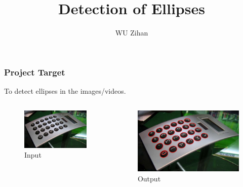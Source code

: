 \documentclass{beamer}
\title{Detection of Ellipses}
\author{WU Zihan}
\begin{document}
    \maketitle
    \begin{frame}
        \frametitle{Project Target}
    
        To detect ellipses in the images/videos.
        \begin{columns}
            \begin{column}{.5\linewidth}
                \begin{figure}
                    \includegraphics[width=0.8\linewidth]{pic/source.jpg}
                    \caption{Input}
                \end{figure}
            \end{column}
            \begin{column}{.5\linewidth}
                \begin{figure}
                    \includegraphics[width=0.8\linewidth]{pic/ideaoutput.jpg}
                    \caption{Output}
                \end{figure}
            \end{column}
        \end{columns}
    
    \end{frame}
\end{document}
